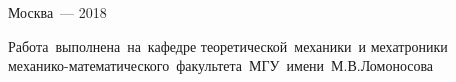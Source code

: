 %
\vspace{0pt plus4fill} %
\begin{center}%
{Москва~--- 2018}
\end{center}%
\newpage

\thispagestyle{empty}
\begin{center}
    Работа~выполнена~на~кафедре теоретической~механики~и мехатроники механико-математического~факультета~МГУ~имени~М.В.Ломоносова
\end{center}

\par\bigskip
    \noindent%
